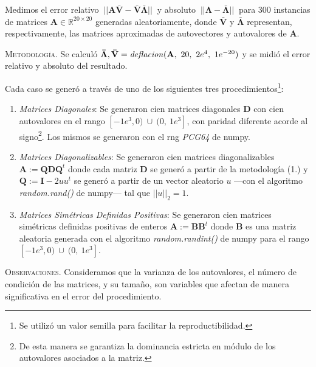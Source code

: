 \vspace{1em}
\noindent Medimos el error relativo $\ ||\mathbf{A} \mathbf{\bar{V}} - \mathbf{\bar{V}} \mathbf{\bar{\Lambda}}||\ $ y absoluto $\ ||\mathbf{\Lambda} - \mathbf{\bar{\Lambda}}||\ $ para 300 instancias de matrices $\mathbf{A} \in \mathbb{R}^{20 \times 20}$ generadas aleatoriamente, donde $\mathbf{\bar{V}}$ y $\mathbf{\bar{\Lambda}}$ representan, respectivamente, las matrices aproximadas de autovectores y autovalores de \textbf{A}.


\vspace{2em}
\noindent \textsc{Metodología}. Se calculó $\mathbf{\bar{\Lambda}}, \mathbf{\bar{V}} = \text{\textit{deflacion}}(\mathbf{A},\ 20,\ 2e^4,\ 1e^{-20})$ y se midió el error relativo y absoluto del resultado.

\vspace{1em}
\noindent Cada caso se generó a través de uno de los siguientes tres procedimientos\footnote{Se utilizó un valor semilla para facilitar la reproductibilidad.}:

\vspace{1em}
\begin{enumerate}
    \item \textit{Matrices Diagonales}: Se generaron cien matrices diagonales \textbf{D} con cien autovalores en el rango $[-1e^3, 0)\ \cup\ (0,\ 1e^3]$, con paridad diferente acorde al signo\footnote{De esta manera se garantiza la dominancia estricta en módulo de los autovalores asociados a la matriz.}. Los mismos se generaron con el rng \textit{PCG64} de numpy.
    \\
    \item \textit{Matrices Diagonalizables}: Se generaron cien matrices diagonalizables $\mathbf{A} := \mathbf{Q} \mathbf{D} \mathbf{Q}^t$ donde cada matriz $\mathbf{D}$ se generó a partir de la metodología (1.) y $\mathbf{Q} := \mathbf{I} - 2uu^t$ se generó a partir de un vector aleatorio $u$ ---con el algoritmo \textit{random.rand()} de numpy--- tal que $||u||_2 = 1$.
    \\
    \item \textit{Matrices Simétricas Definidas Positivas}: Se generaron cien matrices simétricas definidas positivas de enteros $\mathbf{A} := \mathbf{B} \mathbf{B}^t$ donde \textbf{B} es una matriz aleatoria generada con el algoritmo \textit{random.randint()} de numpy para el rango $[-1e^3, 0)\ \cup\ (0,\ 1e^3]$.
\end{enumerate}

\vspace{2em}
\noindent \textsc{Observaciones}. Consideramos que la varianza de los autovalores, el número de condición de las matrices, y su tamaño, son variables que afectan de manera significativa en el error del procedimiento. 

